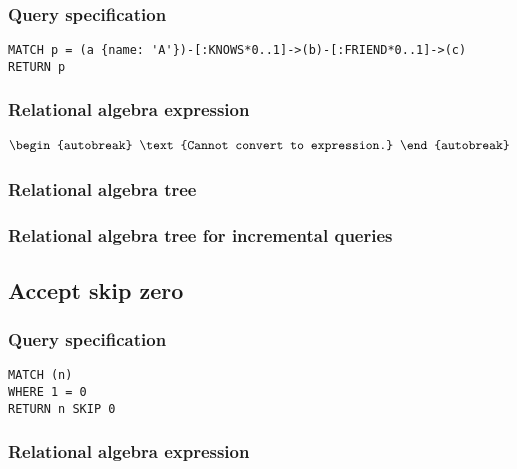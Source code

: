 \subsubsection*{Query specification}

\begin{lstlisting}
MATCH p = (a {name: 'A'})-[:KNOWS*0..1]->(b)-[:FRIEND*0..1]->(c)
RETURN p
\end{lstlisting}

\subsubsection*{Relational algebra expression}

\begin{align*}
\begin{autobreak}
\text{Cannot convert to expression.}
\end{autobreak}
\end{align*}

\subsubsection*{Relational algebra tree}


\subsubsection*{Relational algebra tree for incremental queries}


\subsection{Accept skip zero}

\subsubsection*{Query specification}

\begin{lstlisting}
MATCH (n)
WHERE 1 = 0
RETURN n SKIP 0
\end{lstlisting}

\subsubsection*{Relational algebra expression}

